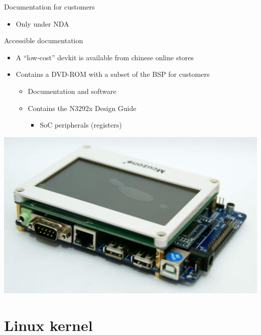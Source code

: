 \documentclass[xetex,table]{beamer}
\begin{document}
\begin{frame}{Documentation for customers}
  \begin{itemize}
  \item Only under NDA
  \end{itemize}
\end{frame}

\begin{frame}{Accessible documentation}
  \begin{itemize}
  \item A ``low-cost'' devkit is available from chinese online stores
  \item Contains a DVD-ROM with a subset of the BSP for customers
    \begin{itemize}
    \item Documentation and software
    \item Contains the N3292x Design Guide
      \begin{itemize}
      \item SoC peripherals (registers)
      \end{itemize}
    \end{itemize}
  \end{itemize}
  \begin{center}
    \includegraphics[height=0.4\textheight]{images/devkit.jpg}
  \end{center}
\end{frame}

\section{Linux kernel}
\end{document}
